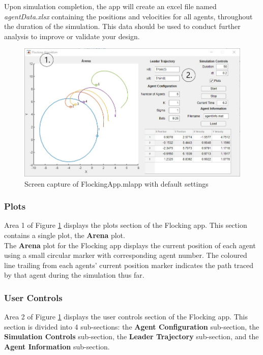 \documentclass[../CourseManual.tex]{subfiles}
\begin{document}
Upon simulation completion, the app will create an excel file named \textit{agentData.xlsx} containing the positions and velocities for all agents, throughout the duration of the simulation. This data should be used to conduct further analysis to improve or validate your design.

\begin{figure}[H]
    \centering
    \includegraphics[width=350pt]{media/Flocking.jpg}
    \caption{Screen capture of FlockingApp.mlapp with default settings}
    \label{fig: flocking app}
\end{figure}

\subsubsection{Plots} \label{Plots: Flocking}
Area 1 of Figure \ref{fig: flocking app} displays the plots section of the Flocking app. This section contains a single plot, the \textbf{Arena} plot. \\

The \textbf{Arena} plot for the Flocking app displays the current position of each agent using a small circular marker with corresponding agent number. The coloured line trailing from each agents' current position marker indicates the path traced by that agent during the simulation thus far.  


\subsubsection{User Controls} \label{User Controls: Flocking}
Area 2 of Figure \ref{fig: flocking app} displays the user controls section of the Flocking app. This section is divided into 4 sub-sections: the \textbf{Agent Configuration} sub-section, the \textbf{Simulation Controls} sub-section, the \textbf{Leader Trajectory} sub-section, and the \textbf{Agent Information} sub-section.\\
\end{document}
